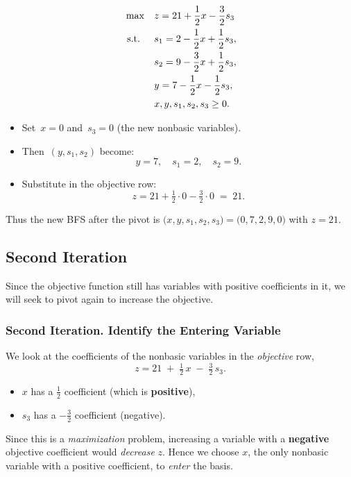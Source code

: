 \begin{tcolorbox}[colback=algpivot!6, colframe=algpivot, coltitle=white, fonttitle=\bfseries, sharp corners, title={\ding{114}\ Pivot: Second Dictionary}]

\[
\begin{aligned}
\max\quad 
& z =  21 + \frac{1}{2}x - \frac{3}{2}s_3 \\
\text{ s.t. }\quad 
& s_1  = 2 - \frac{1}{2}x + \frac{1}{2}s_3, \\
& s_2  = 9 - \frac{3}{2}x + \frac{1}{2}s_3, \\
& y = 7 - \frac{1}{2}x - \frac{1}{2}s_3, \\
& x, y, s_1, s_2, s_3 \ge 0.
\end{aligned}
\]

\begin{itemize}
  \item Set \(\,x=0\) and \(\,s_3=0\) (the new nonbasic variables). 
  \item Then \(\,(y,s_1,s_2)\) become:
  \[
  y = 7, 
  \quad
  s_1 = 2,
  \quad
  s_2 = 9.
  \]
  \item Substitute in the objective row:
  \[
  z = 21 + \tfrac12\cdot 0 - \tfrac32\cdot 0 \;=\; 21.
  \]
\end{itemize}
Thus the new BFS after the pivot is 
\(\bigl(x,y,s_1,s_2,s_3\bigr) = \bigl(0,7,2,9,0\bigr)\) 
with \(z=21\).
\end{tcolorbox}

\subsection*{Second Iteration}
Since the objective function still has variables with positive coefficients in it, we will seek to pivot again to increase the objective.

\subsubsection*{Second Iteration. Identify the Entering Variable}
\begin{tcolorbox}[colback=algenter!6, colframe=algenter, coltitle=white, fonttitle=\bfseries, sharp corners, title={\ding{43}\ Second Iteration: Entering Variable}]
We look at the coefficients of the nonbasic variables in the \emph{objective} row,
\[
z = 21 \;+\; \tfrac12\,x \;-\;\tfrac32\,s_3.
\]
\begin{itemize}
  \item \(x\) has a \(\tfrac12\) coefficient (which is \textbf{positive}), 
  \item \(s_3\) has a \(-\tfrac32\) coefficient (negative).
\end{itemize}
Since this is a \emph{maximization} problem, increasing a variable with a \textbf{negative} objective coefficient would \emph{decrease} \(z\).  
Hence we choose \(x\), the only nonbasic variable with a positive coefficient, to \emph{enter} the basis.
\end{tcolorbox}
